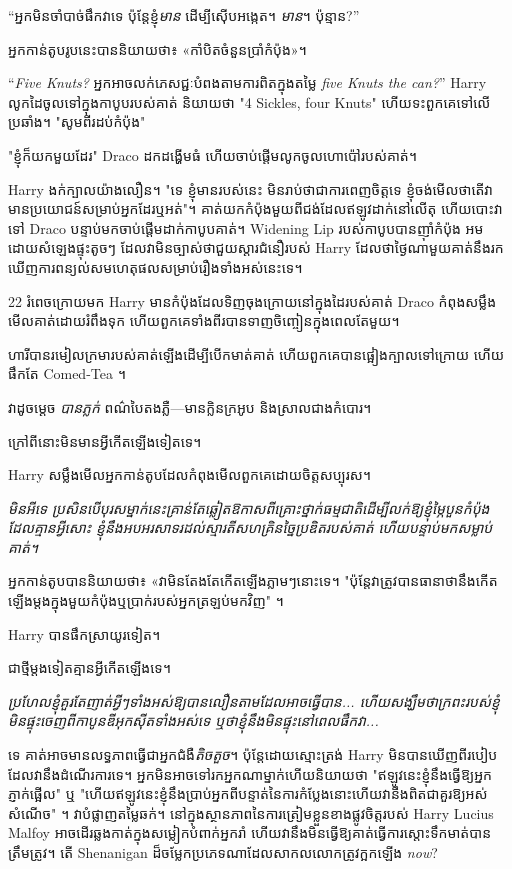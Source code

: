 “អ្នកមិនចាំបាច់ផឹកវាទេ ប៉ុន្តែខ្ញុំ\emph{មាន} ដើម្បីស៊ើបអង្កេត។ \emph{មាន}។ ប៉ុន្មាន?”

អ្នក​កាន់​តូប​រូប​នេះ​បាន​និយាយ​ថា​៖ «​កាំបិត​ចំនួន​ប្រាំ​កំប៉ុង​»។

“\emph{Five Knuts?} អ្នកអាចលក់ភេសជ្ជៈបំពងតាមការពិតក្នុងតម្លៃ \emph{five Knuts the can?}” Harry លូកដៃចូលទៅក្នុងកាបូបរបស់គាត់ និយាយថា "4 Sickles, four Knuts" ហើយទះពួកគេទៅលើ ប្រឆាំង។ "សូមពីរដប់កំប៉ុង"

"ខ្ញុំក៏យកមួយដែរ" Draco ដកដង្ហើមធំ ហើយចាប់ផ្តើមលូកចូលហោប៉ៅរបស់គាត់។

Harry ងក់ក្បាលយ៉ាងលឿន។ "ទេ ខ្ញុំមានរបស់នេះ មិនរាប់ថាជាការពេញចិត្តទេ ខ្ញុំចង់មើលថាតើវាមានប្រយោជន៍សម្រាប់អ្នកដែរឬអត់"។ គាត់​យក​កំប៉ុង​មួយ​ពី​ជង់​ដែល​ឥឡូវ​ដាក់​នៅ​លើ​តុ ហើយ​បោះ​វា​ទៅ Draco បន្ទាប់​មក​ចាប់​ផ្ដើម​ដាក់​កាបូប​គាត់។ Widening Lip របស់កាបូបបានញ៉ាំកំប៉ុង អមដោយសំឡេងផ្ទុះតូចៗ ដែលវាមិនច្បាស់ថាជួយស្ដារជំនឿរបស់ Harry ដែលថាថ្ងៃណាមួយគាត់នឹងរកឃើញការពន្យល់សមហេតុផលសម្រាប់រឿងទាំងអស់នេះទេ។

22 រំពេចក្រោយមក Harry មានកំប៉ុងដែលទិញចុងក្រោយនៅក្នុងដៃរបស់គាត់ Draco កំពុងសម្លឹងមើលគាត់ដោយរំពឹងទុក ហើយពួកគេទាំងពីរបានទាញចិញ្ចៀនក្នុងពេលតែមួយ។

ហារី​បាន​រមៀល​ក្រមា​របស់​គាត់​ឡើង​ដើម្បី​បើក​មាត់​គាត់ ហើយ​ពួកគេ​បាន​ផ្អៀង​ក្បាល​ទៅ​ក្រោយ ហើយ​ផឹក​តែ Comed-Tea ។

វាដូចម្ដេច \emph{បានភ្លក់} ពណ៌បៃតងភ្លឺ—មានក្លិនក្រអូប និងស្រាលជាងកំបោរ។

ក្រៅ​ពី​នោះ​មិន​មាន​អ្វី​កើត​ឡើង​ទៀត​ទេ។

Harry សម្លឹងមើលអ្នកកាន់តូបដែលកំពុងមើលពួកគេដោយចិត្តសប្បុរស។

\emph{មិនអីទេ ប្រសិនបើបុរសម្នាក់នេះគ្រាន់តែឆ្លៀតឱកាសពីគ្រោះថ្នាក់ធម្មជាតិដើម្បីលក់ឱ្យខ្ញុំម្ភៃបួនកំប៉ុងដែលគ្មានអ្វីសោះ ខ្ញុំនឹងអបអរសាទរដល់ស្មារតីសហគ្រិនច្នៃប្រឌិតរបស់គាត់ ហើយបន្ទាប់មកសម្លាប់គាត់។}

អ្នក​កាន់​តូប​បាន​និយាយ​ថា៖ «វា​មិន​តែង​តែ​កើត​ឡើង​ភ្លាមៗ​នោះ​ទេ។ "ប៉ុន្តែវាត្រូវបានធានាថានឹងកើតឡើងម្តងក្នុងមួយកំប៉ុងឬប្រាក់របស់អ្នកត្រឡប់មកវិញ" ។

Harry បានផឹកស្រាយូរទៀត។

ជាថ្មីម្តងទៀតគ្មានអ្វីកើតឡើងទេ។

\emph{ប្រហែលខ្ញុំគួរតែញាត់អ្វីៗទាំងអស់ឱ្យបានលឿនតាមដែលអាចធ្វើបាន... ហើយសង្ឃឹមថាក្រពះរបស់ខ្ញុំមិនផ្ទុះចេញពីកាបូនឌីអុកស៊ីតទាំងអស់ទេ ឬថាខ្ញុំនឹងមិនផ្ទុះនៅពេលផឹកវា...}

ទេ គាត់អាចមានលទ្ធភាពធ្វើជាអ្នកជំងឺ\emph{តិចតួច}។ ប៉ុន្តែដោយស្មោះត្រង់ Harry មិនបានឃើញពីរបៀបដែលវានឹងដំណើរការទេ។ អ្នក​មិន​អាច​ទៅ​រក​អ្នក​ណា​ម្នាក់​ហើយ​និយាយ​ថា "ឥឡូវ​នេះ​ខ្ញុំ​នឹង​ធ្វើ​ឱ្យ​អ្នក​ភ្ញាក់​ផ្អើល" ឬ "ហើយ​ឥឡូវ​នេះ​ខ្ញុំ​នឹង​ប្រាប់​អ្នក​ពី​បន្ទាត់​នៃ​ការ​កំប្លែង​នោះ​ហើយ​វា​នឹង​ពិត​ជា​គួរ​ឱ្យ​អស់​សំណើច​" ។ វាបំផ្លាញតម្លៃឆក់។ នៅក្នុងស្ថានភាពនៃការត្រៀមខ្លួនខាងផ្លូវចិត្តរបស់ Harry Lucius Malfoy អាចដើរឆ្លងកាត់ក្នុងសម្លៀកបំពាក់អ្នករាំ ហើយវានឹងមិនធ្វើឱ្យគាត់ធ្វើការស្តោះទឹកមាត់បានត្រឹមត្រូវ។ តើ Shenanigan ដ៏ចម្លែកប្រភេទណាដែលសាកលលោកត្រូវក្អកឡើង \emph{now}?

